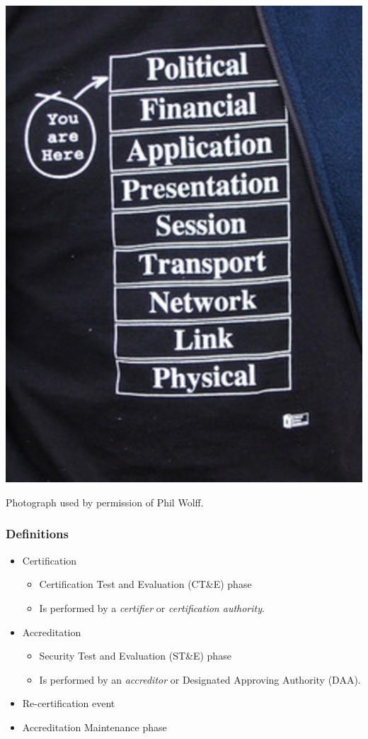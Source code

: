 \documentclass{beamer}
\begin{document}
\begin{frame}
	\begin{center}
		\includegraphics{ISO-9-layer-model-smaller.eps}
	\end{center}
	\tiny{Photograph used by permission of Phil Wolff.}
\end{frame}

\begin{frame}
	\frametitle{Definitions}
	\begin{itemize}
		\item Certification
			\begin{itemize}
				\item Certification Test and Evaluation (CT\&E) phase
				\item Is performed by a \emph{certifier} or \emph{certification authority}.
			\end{itemize}
		\item Accreditation
			\begin{itemize}
				\item Security Test and Evaluation (ST\&E) phase
				\item Is performed by an \emph{accreditor} or Designated Approving Authority
					(DAA).
			\end{itemize}
		\item Re-certification event
		\item Accreditation Maintenance phase
	\end{itemize}
\end{frame}
\end{document}
